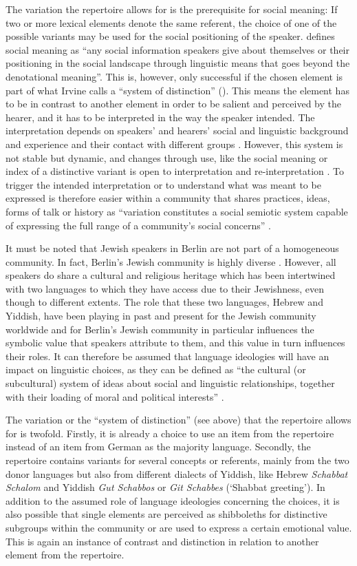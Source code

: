 \documentclass[output=paper]{langscibook}
\begin{document}
The variation the repertoire allows for is the prerequisite for social meaning: If two or more lexical elements denote the same referent, the choice of one of the possible variants may be used for the social positioning of the speaker. \citep[66]{JahnsToAppear} defines social meaning as “any social information speakers give about themselves or their positioning in the social landscape through linguistic means that goes beyond the denotational meaning”. This is, however, only successful if the chosen element is part of what Irvine calls a “system of distinction” (\citeyear[22]{Irvine2001}). This means the element has to be in contrast to another element in order to be salient and perceived by the hearer, and it has to be interpreted in the way the speaker intended. The interpretation depends on speakers' and hearers' social and linguistic background and experience and their contact with different groups \citep[24]{Irvine2001}. However, this system is not stable but dynamic, and changes through use, like the social meaning or index of a distinctive variant is open to interpretation and re-interpretation \citep{Eckert2008}. To trigger the intended interpretation or to understand what was meant to be expressed is therefore easier within a community that shares practices, ideas, forms of talk or history as “variation constitutes a social semiotic system capable of expressing the full range of a community’s social concerns” \citep[94]{Eckert2012}.

It must be noted that Jewish speakers in Berlin are not part of a homogeneous community. In fact, Berlin’s Jewish community is highly diverse \citep{Belkin2017}. However, all speakers do share a cultural and religious heritage which has been intertwined with two languages to which they have access due to their Jewishness, even though to different extents. The role that these two languages, Hebrew and Yiddish, have been playing in past and present for the Jewish community worldwide and for Berlin’s Jewish community in particular influences the symbolic value that speakers attribute to them, and this value in turn influences their roles. It can therefore be assumed that language ideologies will have an impact on linguistic choices, as they can be defined as “the cultural (or subcultural) system of ideas about social and linguistic relationships, together with their loading of moral and political interests” \citep[255]{Irvine1989}.

The variation or the “system of distinction” (see above) that the repertoire allows for is twofold. Firstly, it is already a choice to use an item from the repertoire instead of an item from German as the majority language. Secondly, the repertoire contains variants for several concepts or referents, mainly from the two donor languages but also from different dialects of Yiddish, like Hebrew \textit{Schabbat Schalom} and Yiddish \textit{Gut Schabbos} or \textit{Git Schabbes} (‘Shabbat greeting’). In addition to the assumed role of language ideologies concerning the choices, it is also possible that single elements are perceived as shibboleths for distinctive subgroups within the community or are used to express a certain emotional value. This is again an instance of contrast and distinction in relation to another element from the repertoire.
\end{document}
